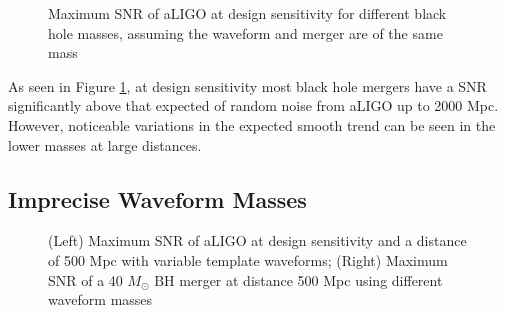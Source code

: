 \documentclass{article}
\begin{document}
\begin{figure}[!htb]
    \caption{\label{fig:massdistance} Maximum SNR of aLIGO at design sensitivity for different black hole masses, assuming the waveform and merger are of the same mass}
\end{figure}

As seen in Figure \ref{fig:massdistance}, at design sensitivity most black hole mergers have a SNR significantly above that expected of random noise from aLIGO up to 2000 Mpc. However, noticeable variations in the expected smooth trend can be seen in the lower masses at large distances.  

\subsection{Imprecise Waveform Masses}

\begin{figure}[!htb]
    \caption{\label{fig:waveformspread} (Left) Maximum SNR of aLIGO at design sensitivity and a distance of 500 Mpc with variable template waveforms; (Right) Maximum SNR of a 40 $M_\odot$ BH merger at distance 500 Mpc using different waveform masses}
\end{figure}
\end{document}
